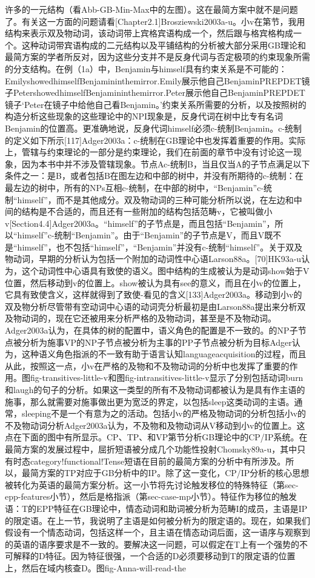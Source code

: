 许多的一元结构（看Abb-GB-Min-Max中的左图）。这在最简方案中就不是问题了。有关这一方面的问题请看[Chapter2.1]Brosziewski2003a-u。小v在第节，我用结构来表示双及物动词，该动词带上宾格宾语构成一个，然后跟与格宾格构成一个。这种动词带宾语构成的二元结构以及平铺结构的分析被大部分采用GB理论和最简方案的学者所反对，因为这些分支并不是反身代词与否定极项的约束现象所需的分支结构。在例（1a）中，Benjamin与himself具有约束关系是不可能的：EmilyshowedhimselfBenjamininthemirror.Emily展示他自己BenjaminPREPDET镜子PetershowedhimselfBenjamininthemirror.Peter展示他自己BenjaminPREPDET镜子`Peter在镜子中给他自己看Benjamin。'约束关系所需要的分析，以及按照树的构造分析这些现象的这些理论中的NPI现象是，反身代词在树中比专有名词Benjamin的位置高。更准确地说，反身代词himself必须c-统制Benjamin。c-统制的定义如下所示[117]Adger2003a：c-统制在GB理论中也发挥着重要的作用。实际上，管辖与约束理论的一部分是约束理论，我们在前面的章节中没有讨论这一现象，因为本书中并不涉及管辖现象。节点Ac-统制B，当且仅当A的子节点满足以下条件之一：是B，或者包括B在图左边和中部的树中，并没有所期待的c-统制：在最左边的树中，所有的NPs互相c-统制，在中部的树中，“Benjamin”c-统制“himself”，而不是其他成分。双及物动词的三种可能分析所以说，在左边和中间的结构是不合适的，而且还有一些附加的结构包括范畴v，它被叫做小v[Section4.4]Adger2003a。“himself”的子节点是，而且包括“Benjamin”，所以“himself”c-统制“Benjamin”。由于“Benjamin”的子节点是V，而且V既不是“himself”，也不包括“himself”，“Benjamin”并没有c-统制“himself”。关于双及物动词，早期的分析认为包括一个附加的动词性中心语Larson88a。[70]HK93a-u认为，这个动词性中心语具有致使的语义。图中结构的生成被认为是动词show始于V位置，然后移动到v的位置上。show被认为具有see的意义，而且在小v的位置上，它具有致使含义，这样就得到了致使-看见的含义[133]Adger2003a。移动到小v的双及物分析尽管带有空动词中心语的动词壳分析最初是由Larson88a提出来分析双及物动词的，现在它还被用来分析严格的及物动词，甚至是不及物动词。Adger2003a认为，在具体的树的配置中，语义角色的配置是不一致的。的NP子节点被分析为施事VP的NP子节点被分析为主事的PP子节点被分析为目标Adger认为，这种语义角色指派的不一致有助于语言认知languageacquisition的过程，而且从此，按照这一点，小v在严格的及物和不及物动词的分析中也发挥了重要的作用。图fig-transitives-little-v和图fig-intransitives-little-v显示了分别包括动词burn和laugh的句子的分析。如果这一类型的所有不及物动词都被认为是具有作主语的施事，那么就需要对施事做出更为宽泛的界定，以包括sleep这类动词的主语。通常，sleeping不是一个有意为之的活动。包括小v的严格及物动词的分析包括小v的不及物动词分析Adger2003a认为，不及物和及物动词从V移动到小v的位置上。这点在下面的图中有所显示。CP、TP、和VP第节分析GB理论中的CP/IP系统。在最简方案的发展过程中，屈折短语被分成几个功能性投射Chomsky89a-u，其中只有时态category!functional!Tense短语在目前的最简方案的分析中有所涉及。所以，最简方案的TP对应于GB分析中的IP。除了这一变化，CP/IP分析的核心思想被转化为英语的最简方案分析。这一小节将先讨论触发移位的特殊特征（第sec-epp-features小节），然后是格指派（第sec-case-mp小节）。特征作为移位的触发语：T的EPP特征在GB理论中，情态动词和助词被分析为范畴I的成员，主语是IP的限定语。在上一节，我说明了主语是如何被分析为的限定语的。现在，如果我们假设有一个情态动词，包括这样一个，且主语在情态动词后面，这一语序与观察到的英语的语序要求是不一致的。要解决这一问题，可以假定在T上有一个强势的不可解释的D特征。因为特征很强，一个合适的D必须要移动到T的限定语的位置上，然后在域内核查D。图fig-Anna-will-read-the
